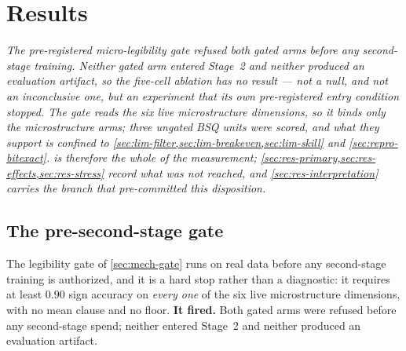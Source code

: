 %
\section{Results}
\label{sec:results}

\emph{The pre-registered micro-legibility gate refused both gated arms before any second-stage
training. Neither gated arm entered Stage~2 and neither produced an evaluation artifact, so the
five-cell ablation has no result --- not a null, and not an inconclusive one, but an experiment
that its own pre-registered entry condition stopped. The gate reads the six live microstructure
dimensions, so it binds only the microstructure arms; three ungated BSQ units were scored, and what
they support is confined to \cref{sec:lim-filter,sec:lim-breakeven,sec:lim-skill} and
\cref{sec:repro-bitexact}.  is therefore the whole of the
measurement; \cref{sec:res-primary,sec:res-effects,sec:res-stress} record what was not reached, and
\cref{sec:res-interpretation} carries the branch that pre-committed this disposition.}

\subsection{The pre-second-stage gate}
\label{sec:res-gate}

The legibility gate of \cref{sec:mech-gate} runs on real data before any second-stage training is
authorized, and it is a hard stop rather than a diagnostic: it requires at least $0.90$ sign
accuracy on \emph{every one} of the six live microstructure dimensions, with no mean clause and no
floor. \textbf{It fired.} Both gated arms were refused before any second-stage spend;
neither entered Stage~2 and neither produced an evaluation artifact.

